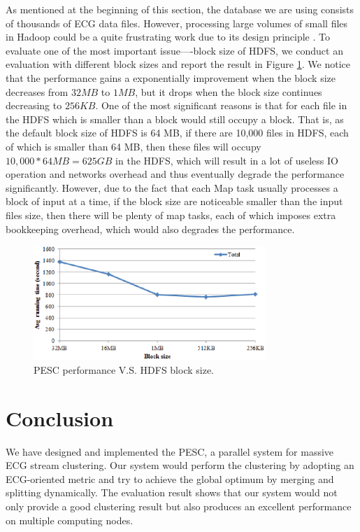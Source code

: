 \documentclass[conference]{IEEEtran}
\begin{document}
As mentioned at the beginning of this section, the database we are using consists of thousands of ECG data files. However, processing large volumes of small files in Hadoop could be a quite frustrating work due to its design principle \cite{white2010hadoop}. To evaluate one of the most important issue----block size of HDFS, we conduct an evaluation with different block sizes and report the result in Figure \ref{fig_block_size}. We notice that the performance gains a exponentially improvement when the block size decreases from $ 32 MB $ to $ 1 MB $, but it drops when the block size continues decreasing to $ 256 KB $. One of the most significant reasons is that for each file in the HDFS which is smaller than a block would still occupy a block. That is, as the default block size of HDFS is 64 MB, if there are 10,000 files in HDFS, each of which is smaller than 64 MB, then these files will occupy $ 10,000 * 64 MB = 625 GB $ in the HDFS, which will result in a lot of useless IO operation and networks overhead and thus eventually degrade the performance significantly. However, due to the fact that each Map task usually processes a block of input at a time, if the block size are noticeable smaller than the input files size, then there will be plenty of map tasks, each of which imposes extra bookkeeping overhead, which would also degrades the performance.
\begin{figure}[!t]
\centering
\includegraphics[height=1.7in]{./Figure/block_size.eps}
\caption{PESC performance V.S. HDFS block size.}
\label{fig_block_size}
\end{figure}



\section{Conclusion}
We have designed and implemented the PESC, a parallel system for massive ECG stream clustering. Our system would perform the clustering by adopting an ECG-oriented metric and try to achieve the global optimum by merging and splitting dynamically. The evaluation result shows that our system would not only provide a good clustering result but also produces an excellent performance on multiple computing nodes.
\end{document}

